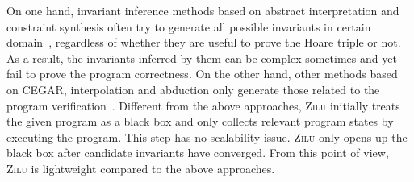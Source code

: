 On one hand, invariant inference methods based on abstract interpretation and constraint synthesis
often try to generate all possible invariants in certain domain~\cite{mine2006octagon,vincent2009subpolyhedra,ashutosh2009invgen}, regardless of
whether they are useful to prove the Hoare triple or not.
As a result, the invariants inferred by them can be complex sometimes and yet fail to prove the program correctness.
On the other hand, other methods based on CEGAR, interpolation and abduction only generate those related to the program verification~\cite{isil2013inductive}.
Different from the above approaches, \textsc{Zilu} initially treats the given program as a black box and only collects relevant program states by executing the program. This step has no scalability issue. 
\textsc{Zilu} only opens up the black box after candidate invariants have converged. From this point of view, \textsc{Zilu} is lightweight compared to the above approaches. 

